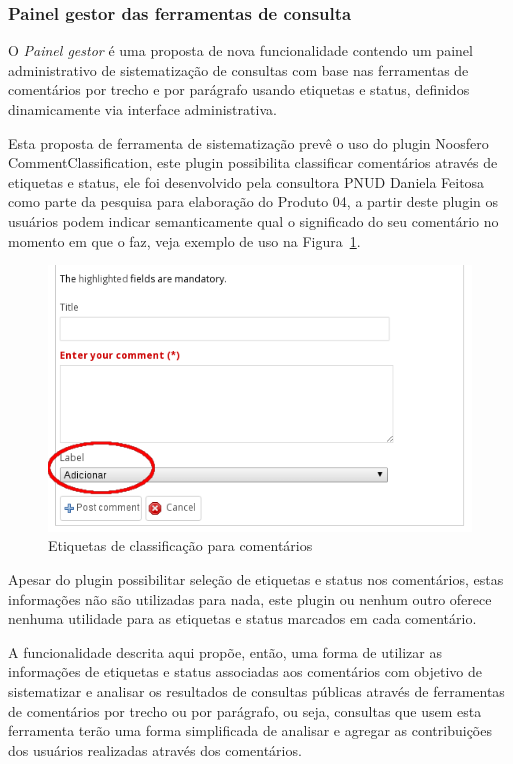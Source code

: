 \documentclass[12pt]{article}
\begin{document}
\subsubsection{Painel gestor das ferramentas de consulta}

O {\it Painel gestor} é uma proposta de nova funcionalidade contendo um painel
administrativo de sistematização de consultas com base nas ferramentas de
comentários por trecho e por parágrafo usando etiquetas e status, definidos
dinamicamente via interface administrativa.

Esta proposta de ferramenta de sistematização prevê o uso do plugin Noosfero
CommentClassification\cite{commentClassificationPlugin}, este plugin
possibilita classificar comentários através de etiquetas e status, ele foi
desenvolvido pela consultora PNUD Daniela Feitosa como
parte da pesquisa para elaboração do Produto 04, a partir
deste plugin os usuários podem indicar semanticamente qual o significado do
seu comentário no momento em que o faz, veja exemplo de uso na
Figura~\ref{etiqueta}.

\begin{figure}[h!]
\center
\includegraphics[scale=0.5]{etiqueta.png}
\caption{Etiquetas de classificação para comentários}
\label{etiqueta}
\end{figure}

Apesar do plugin possibilitar seleção de etiquetas e status nos comentários,
estas informações não são utilizadas para nada, este plugin ou nenhum outro
oferece nenhuma utilidade para as etiquetas e status marcados em cada
comentário.

A funcionalidade descrita aqui propõe, então, uma forma de utilizar as
informações de etiquetas e status associadas aos comentários com objetivo de
sistematizar e analisar os resultados de consultas públicas através de
ferramentas de comentários por trecho ou por parágrafo, ou seja, consultas que
usem esta ferramenta terão uma forma simplificada de analisar e agregar as
contribuições dos usuários realizadas através dos comentários.
\end{document}
